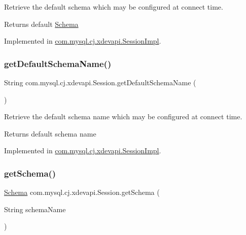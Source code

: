 Retrieve the default schema which may be configured at connect time.

\begin{DoxyReturn}{Returns}
default \mbox{\hyperlink{interfacecom_1_1mysql_1_1cj_1_1xdevapi_1_1_schema}{Schema}} 
\end{DoxyReturn}


Implemented in \mbox{\hyperlink{classcom_1_1mysql_1_1cj_1_1xdevapi_1_1_session_impl_adba641099e94d53a50b08abc745d761b}{com.\+mysql.\+cj.\+xdevapi.\+Session\+Impl}}.

\mbox{\label{interfacecom_1_1mysql_1_1cj_1_1xdevapi_1_1_session_a9c612e7b080af6467b718dcaa3081a84}} 
\subsubsection{\texorpdfstring{get\+Default\+Schema\+Name()}{getDefaultSchemaName()}}
{\footnotesize\ttfamily String com.\+mysql.\+cj.\+xdevapi.\+Session.\+get\+Default\+Schema\+Name (\begin{DoxyParamCaption}{ }\end{DoxyParamCaption})}

Retrieve the default schema name which may be configured at connect time.

\begin{DoxyReturn}{Returns}
default schema name 
\end{DoxyReturn}


Implemented in \mbox{\hyperlink{classcom_1_1mysql_1_1cj_1_1xdevapi_1_1_session_impl_a4aa237ed5d2cfe61c302a11907533b61}{com.\+mysql.\+cj.\+xdevapi.\+Session\+Impl}}.

\mbox{\label{interfacecom_1_1mysql_1_1cj_1_1xdevapi_1_1_session_a70703d4853bdfee2b32da36a27fa2e52}} 
\subsubsection{\texorpdfstring{get\+Schema()}{getSchema()}}
{\footnotesize\ttfamily \mbox{\hyperlink{interfacecom_1_1mysql_1_1cj_1_1xdevapi_1_1_schema}{Schema}} com.\+mysql.\+cj.\+xdevapi.\+Session.\+get\+Schema (\begin{DoxyParamCaption}\item[{String}]{schema\+Name }\end{DoxyParamCaption})}

